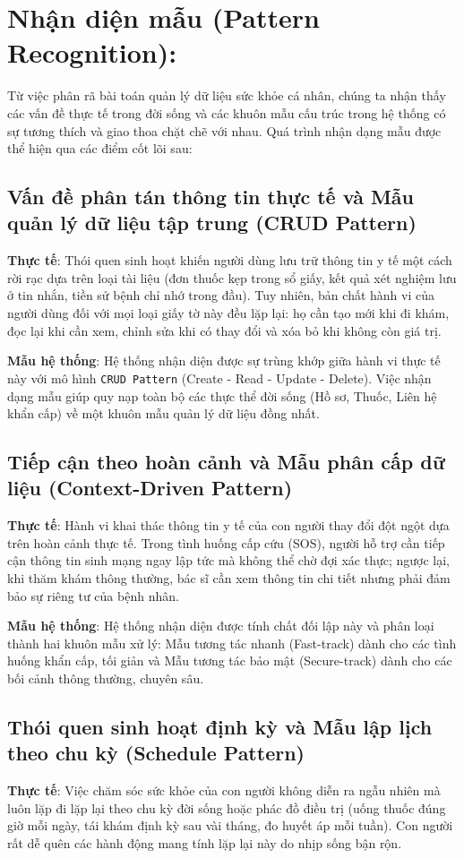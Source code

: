\documentclass[12pt,a4paper]{report}
\begin{document}
\section{Nhận diện mẫu (Pattern Recognition):}
Từ việc phân rã bài toán quản lý dữ liệu sức khỏe cá nhân, chúng ta nhận thấy các vấn đề thực tế trong đời sống và các khuôn mẫu cấu trúc trong hệ thống có sự tương thích và giao thoa chặt chẽ với nhau. Quá trình nhận dạng mẫu được thể hiện qua các điểm cốt lõi sau:
\subsection{Vấn đề phân tán thông tin thực tế và Mẫu quản lý dữ liệu tập trung (CRUD Pattern)}
\textbf{Thực tế}: Thói quen sinh hoạt khiến người dùng lưu trữ thông tin y tế một cách rời rạc dựa trên loại tài liệu (đơn thuốc kẹp trong sổ giấy, kết quả xét nghiệm lưu ở tin nhắn, tiền sử bệnh chỉ nhớ trong đầu). Tuy nhiên, bản chất hành vi của người dùng đối với mọi loại giấy tờ này đều lặp lại: họ cần tạo mới khi đi khám, đọc lại khi cần xem, chỉnh sửa khi có thay đổi và xóa bỏ khi không còn giá trị.

\textbf{Mẫu hệ thống}: Hệ thống nhận diện được sự trùng khớp giữa hành vi thực tế này với mô hình \texttt{CRUD Pattern} (Create - Read - Update - Delete). Việc nhận dạng mẫu giúp quy nạp toàn bộ các thực thể đời sống (Hồ sơ, Thuốc, Liên hệ khẩn cấp) về một khuôn mẫu quản lý dữ liệu đồng nhất.
\subsection{Tiếp cận theo hoàn cảnh và Mẫu phân cấp dữ liệu (Context-Driven Pattern)}
\textbf{Thực tế}: Hành vi khai thác thông tin y tế của con người thay đổi đột ngột dựa trên hoàn cảnh thực tế. Trong tình huống cấp cứu (SOS), người hỗ trợ cần tiếp cận thông tin sinh mạng ngay lập tức mà không thể chờ đợi xác thực; ngược lại, khi thăm khám thông thường, bác sĩ cần xem thông tin chi tiết nhưng phải đảm bảo sự riêng tư của bệnh nhân.

\textbf{Mẫu hệ thống}: Hệ thống nhận diện được tính chất đối lập này và phân loại thành hai khuôn mẫu xử lý: Mẫu tương tác nhanh (Fast-track) dành cho các tình huống khẩn cấp, tối giản và Mẫu tương tác bảo mật (Secure-track) dành cho các bối cảnh thông thường, chuyên sâu.
\subsection{Thói quen sinh hoạt định kỳ và Mẫu lập lịch theo chu kỳ (Schedule Pattern)}
\textbf{Thực tế}: Việc chăm sóc sức khỏe của con người không diễn ra ngẫu nhiên mà luôn lặp đi lặp lại theo chu kỳ đời sống hoặc phác đồ điều trị (uống thuốc đúng giờ mỗi ngày, tái khám định kỳ sau vài tháng, đo huyết áp mỗi tuần). Con người rất dễ quên các hành động mang tính lặp lại này do nhịp sống bận rộn.
\end{document}
